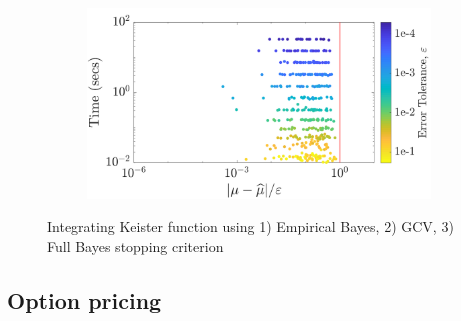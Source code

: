 \documentclass[handout, 10pt,compress,xcolor={usenames,dvipsnames}]{beamer} %
\begin{document}
{\begin{figure}[htp]
\begin{subfigure}[b]{0.43\textwidth}
			\includegraphics[width=\textwidth]{"../figures/Sobol/Sobol_Keister_guaranteed_time_full__d4_r1_2019-Sep-1"}
		\end{subfigure}
		\caption{Integrating Keister function using 1) Empirical Bayes, 2) GCV, 3) Full Bayes stopping criterion}
	\end{figure}
}



\subsection{Option pricing}
\end{document}
